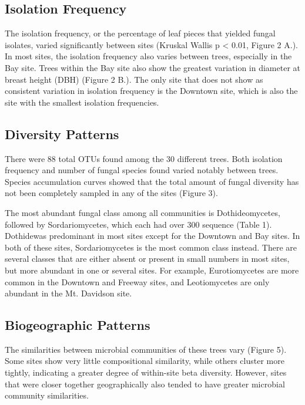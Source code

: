 \documentclass[fleqn,10pt,lineno]{wlpeerj} %
\begin{document}
\hypertarget{isolation-frequency}{%
\subsection{Isolation Frequency}\label{isolation-frequency}}

The isolation frequency, or the percentage of leaf pieces that yielded
fungal isolates, varied significantly between sites (Kruskal Wallis p
\textless{} 0.01, Figure 2 A.). In most sites, the isolation frequency
also varies between trees, especially in the Bay site. Trees within the
Bay site also show the greatest variation in diameter at breast height
(DBH) (Figure 2 B.). The only site that does not show as consistent
variation in isolation frequency is the Downtown site, which is also the
site with the smallest isolation frequencies.

\hypertarget{diversity-patterns}{%
\subsection{Diversity Patterns}\label{diversity-patterns}}

There were 88 total OTUs found among the 30 different trees. Both
isolation frequency and number of fungal species found varied notably
between trees. Species accumulation curves showed that the total amount
of fungal diversity has not been completely sampled in any of the sites
(Figure 3).

The most abundant fungal class among all communities is Dothideomycetes,
followed by Sordariomycetes, which each had over 300 sequence (Table 1).
Dothidewas predominant in most sites except for the Downtown and Bay
sites. In both of these sites, Sordariomycetes is the most common class
instead. There are several classes that are either absent or present in
small numbers in most sites, but more abundant in one or several sites.
For example, Eurotiomycetes are more common in the Downtown and Freeway
sites, and Leotiomycetes are only abundant in the Mt. Davidson site.

\hypertarget{biogeographic-patterns}{%
\subsection{Biogeographic Patterns}\label{biogeographic-patterns}}

The similarities between microbial communities of these trees vary
(Figure 5). Some sites show very little compositional similarity, while
others cluster more tightly, indicating a greater degree of within-site
beta diversity. However, sites that were closer together geographically
also tended to have greater microbial community similarities.
\end{document}
